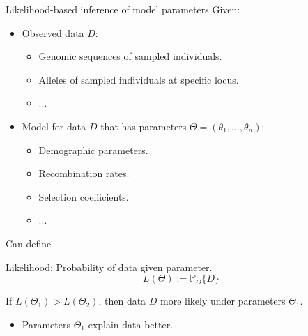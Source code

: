 \documentclass{beamer}
\renewcommand{\P}{\mathbb{P}}
\newcommand{\1}{\ensuremath{\mathbf{1}}}
\begin{document}
\begin{frame}{Likelihood-based inference of model parameters}
    Given:
    \begin{itemize}
        \item Observed data $D$:
        \begin{itemize}
            \item Genomic sequences of sampled individuals.
            \item Alleles of sampled individuals at specific locus.
            \item ...
        \end{itemize}
        \item Model for data $D$ that has parameters $\Theta = (\theta_1, \ldots, \theta_n)$:
        \begin{itemize}
            \item Demographic parameters.
            \item Recombination rates.
            \item Selection coefficients.
            \item ...
        \end{itemize}
    \end{itemize}
    Can define
    \begin{block}{Likelihood: Probability of data given parameter.}
        \begin{equation}
            L(\Theta) := \P_\Theta\{D\}
        \end{equation}
    \end{block}
    If $L(\Theta_1) > L(\Theta_2)$, then data $D$ more likely under parameters $\Theta_1$.
    \begin{itemize}
        \item Parameters $\Theta_1$ explain data better.
    \end{itemize}
\end{frame}
%
%
%
\end{document}
